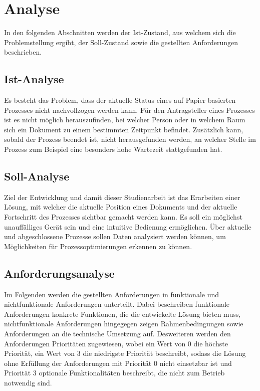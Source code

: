 \chapter{Analyse} \label{chap:analyse}

In den folgenden Abschnitten werden der Ist-Zustand, aus welchem sich die Problemstellung ergibt,
der Soll-Zustand sowie die gestellten Anforderungen beschrieben.

\section{Ist-Analyse} \label{sec:ist-analyse}

Es besteht das Problem, dass der aktuelle Status eines auf Papier basierten Prozesses nicht nachvollzogen werden kann.
Für den Antragsteller eines Prozesses ist es nicht möglich herauszufinden, bei welcher Person oder in welchem Raum sich ein Dokument
zu einem bestimmten Zeitpunkt befindet.
Zusätzlich kann, sobald der Prozess beendet ist, nicht herausgefunden werden, an welcher Stelle im Prozess zum Beispiel eine besonders
hohe Wartezeit stattgefunden hat.

\section{Soll-Analyse} \label{sec:soll-analyse}

Ziel der Entwicklung und damit dieser Studienarbeit ist das Erarbeiten einer Lösung, mit welcher die aktuelle Position eines Dokuments und der aktuelle Fortschritt des Prozesses sichtbar gemacht werden kann.
Es soll ein möglichst unauffälliges Gerät sein und eine intuitive Bedienung ermöglichen.
Über aktuelle und abgeschlossene Prozesse sollen Daten analysiert werden können, um Möglichkeiten für Prozessoptimierungen erkennen zu können.

\section{Anforderungsanalyse} \label{sec:anforderungsanalyse}

Im Folgenden werden die gestellten Anforderungen in funktionale und nichtfunktionale Anforderungen
unterteilt.
Dabei beschreiben funktionale Anforderungen konkrete Funktionen, die die entwickelte Lösung bieten
muss, nichtfunktionale Anforderungen hingegegen zeigen Rahmenbedingungen sowie Anforderungen an die
technische Umsetzung auf.
Desweiteren werden den Anforderungen Prioritäten zugewiesen, wobei ein Wert von 0 die höchste
Priorität, ein Wert von 3 die niedrigste Priorität beschreibt, sodass die Lösung ohne Erfüllung der
Anforderungen mit Priorität 0 nicht einsetzbar ist und Priorität 3 optionale Funktionalitäten
beschreibt, die nicht zum Betrieb notwendig sind.

